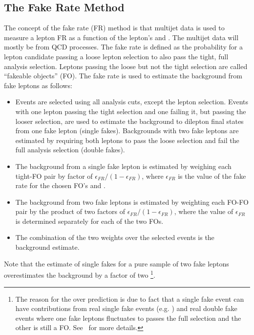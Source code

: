 \subsection{The Fake Rate Method}
\label {sec:bkgd_fakes_method}
The concept of the fake rate (FR) method is that multijet data is used to
measure a lepton FR as a function of the lepton's \pt and \aeta. The multijet
data will mostly be from QCD processes. The fake rate is defined as the
probability for a lepton candidate passing a loose lepton selection to also
pass the tight, full analysis selection. Leptons passing the loose but not the
tight selection are called ``fakeable objects'' (FO). The fake rate is used to
estimate the background from fake leptons as follows:
\begin{itemize}
\item Events are selected using all analysis cuts, except the lepton selection.
Events with one lepton passing the tight selection and one failing it, but
passing the looser selection, are used to estimate the background to dilepton
final states from one fake lepton (single fakes). Backgrounds with two fake
leptons are estimated by requiring both leptons to pass the loose selection and
fail the full analysis selection (double fakes).
\item The background from a single fake lepton is estimated by weighing
each tight-FO pair by factor of $\epsilon_{FR}/(1 - \epsilon_{FR})$, where
$\epsilon_{FR}$ is the value of the fake rate for the chosen FO's \pt and
\aeta.
\item The background from two fake leptons is estimated by weighting each FO-FO pair
by the product of two factors of $\epsilon_{FR}/(1 - \epsilon_{FR})$, where the
value of $\epsilon_{FR}$ is determined separately for each of the two FOs.
\item The combination of the two weights over the selected events is the background estimate.
\end{itemize}
Note that the estimate of single fakes for a pure sample of two fake leptons
overestimates the background by a factor of two
\footnote{
The reason for the over prediction is due to fact that a single fake
event can have contributions from real single fake events (e.g. \Wj) and
real double fake events where one fake leptons fluctuates to passes the full
selection and the other is still a FO. See~\cite{an_ss2011} for more details.
}.

